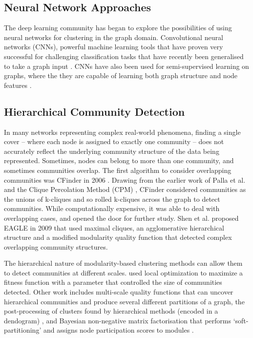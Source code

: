 \documentclass{report}
\begin{document}
	
	\subsection{Neural Network Approaches}
	The deep learning community has began to explore the possibilities of using neural networks for clustering in the graph domain. Convolutional neural networks (CNNs), powerful machine learning tools that have proven very successful for challenging classification tasks that have recently been generalised to take a graph input \cite{defferrard2016convolutional}. 
	CNNs have also been used for semi-supervised learning on graphs, where the they are capable of learning both graph structure and node features \cite{kipf2016semi}. 
	
	\subsection{Hierarchical Community Detection}
	
	In many networks representing complex real-world phenomena, finding a single cover -- where each node is assigned to exactly one community -- does not accurately reflect the underlying community structure of the data being represented. Sometimes, nodes can belong to more than one community, and sometimes communities overlap. The first algorithm to consider overlapping communities was CFinder in 2006 \cite{adamcsek2006cfinder}. Drawing from the earlier work of Palla et al. and the Clique Percolation Method (CPM) \cite{palla2005uncovering}, CFinder considered communities as the unions of k-cliques and so rolled k-cliques across the graph to detect communities. While computationally expensive, it was able to deal with overlapping cases, and opened the door for further study. Shen et al. proposed EAGLE in 2009 \cite{shen2009detect} that used maximal cliques, an agglomerative hierarchical structure and a modified modularity quality function that detected complex overlapping community structures.
	
	The hierarchical nature of modularity-based clustering methods can allow them to detect communities at different scales. 
	\cite{lancichinetti2009detecting} used local optimization to maximize a fitness function with a parameter that controlled the size of communities detected.
	Other work includes multi-scale quality functions that can uncover hierarchical communities and produce several different partitions of a graph, the post-processing of clusters found by hierarchical methods (encoded in a dendogram) \cite{pons2011post}, and Bayesian non-negative matrix factorisation that performs `soft-partitioning' and assigns node participation scores to modules \cite{psorakis2011overlapping}.
	
\end{document}

